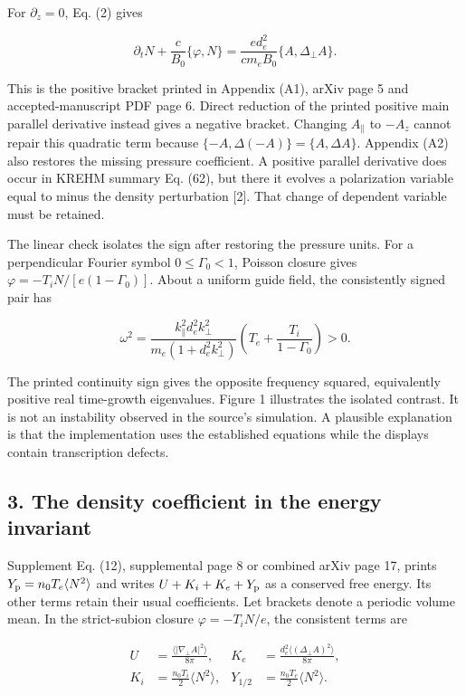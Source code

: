 For \(\partial_z=0\), Eq. (2) gives

\[
\partial_tN+\frac c{B_0}\{\varphi,N\}
=\frac{ed_e^2}{cm_eB_0}\{A,\Delta_\perp A\}.
\tag{3}
\]

This is the positive bracket printed in Appendix (A1), arXiv page 5 and
accepted-manuscript PDF page 6. Direct reduction of the printed positive
main parallel derivative instead gives a negative bracket. Changing
\(A_\parallel\) to \(-A_z\) cannot repair this quadratic term because
\(\{-A,\Delta(-A)\}=\{A,\Delta A\}\). Appendix (A2) also restores the
missing pressure coefficient. A positive parallel derivative does occur
in KREHM summary Eq. (62), but there it evolves a polarization variable
equal to minus the density perturbation {[}2{]}. That change of
dependent variable must be retained.

The linear check isolates the sign after restoring the pressure units.
For a perpendicular Fourier symbol \(0\le\Gamma_0<1\), Poisson closure
gives \(\varphi=-T_iN/[e(1-\Gamma_0)]\). About a uniform guide field,
the consistently signed pair has

\[
\omega^2=
\frac{k_\parallel^2d_e^2k_\perp^2}
 {m_e(1+d_e^2k_\perp^2)}
\left(T_e+\frac{T_i}{1-\Gamma_0}\right)>0.
\tag{4}
\]

The printed continuity sign gives the opposite frequency squared,
equivalently positive real time-growth eigenvalues. Figure 1 illustrates
the isolated contrast. It is not an instability observed in the source's
simulation. A plausible explanation is that the implementation uses the
established equations while the displays contain transcription defects.

\subsection{3. The density coefficient in the energy
invariant}\label{the-density-coefficient-in-the-energy-invariant}

Supplement Eq. (12), supplemental page 8 or combined arXiv page 17,
prints \(Y_{\rm p}=n_0T_e\langle N^2\rangle\) and writes
\(U+K_i+K_e+Y_{\rm p}\) as a conserved free energy. Its other terms
retain their usual coefficients. Let brackets denote a periodic volume
mean. In the strict-subion closure \(\varphi=-T_iN/e\), the consistent
terms are

\[
\begin{aligned}
U&=\frac{\langle|\nabla_\perp A|^2\rangle}{8\pi},&
K_e&=\frac{d_e^2\langle(\Delta_\perp A)^2\rangle}{8\pi},\\
K_i&=\frac{n_0T_i}{2}\langle N^2\rangle,&
Y_{1/2}&=\frac{n_0T_e}{2}\langle N^2\rangle.
\end{aligned}
\tag{5}
\]

